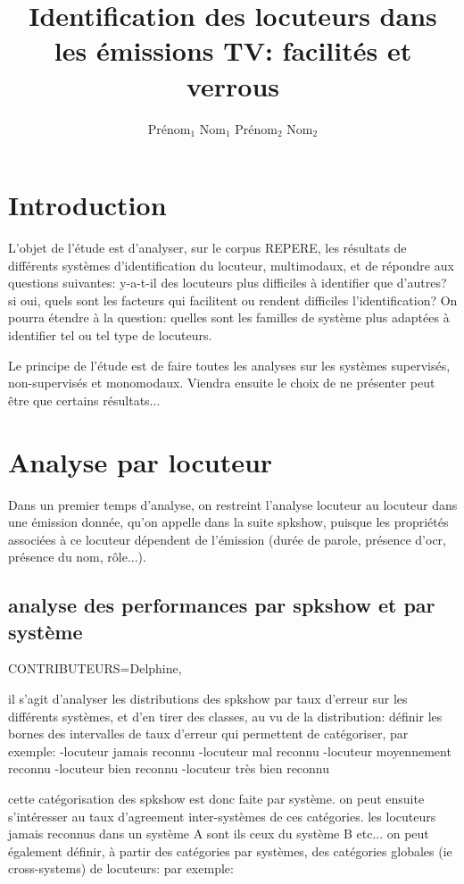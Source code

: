 \documentclass[utf8x]{article-hermes}
\title[Titre court]{Identification des locuteurs dans les émissions TV: facilités et verrous}
\author{Prénom$_1$ Nom$_1$\fup{*} \andauthor Prénom$_2$ Nom$_2$\fup{**}  }
\begin{document}
\maketitlepage

\newcommand{\fakesentence}{Attention à ce que les figures et les tableaux ne débordent pas dans les marges. }
\newcommand{\fakeparagraph}{
\fakesentence
\fakesentence
\fakesentence
\fakesentence
\fakesentence
\fakesentence
}

\section{Introduction}

L'objet de l'étude est d'analyser, sur le corpus REPERE, les résultats de différents systèmes d'identification du locuteur, multimodaux, et de répondre aux questions suivantes: y-a-t-il des locuteurs plus difficiles à identifier que d'autres? si oui, quels sont les facteurs qui facilitent ou rendent difficiles l'identification? 
On pourra étendre à la question: quelles sont les familles de système plus adaptées à identifier tel ou tel type de locuteurs.

Le principe de l'étude est de faire toutes les analyses sur les systèmes supervisés, non-supervisés et monomodaux. Viendra ensuite le choix de ne présenter peut être que certains résultats...

\section{Analyse par locuteur}

Dans un premier temps d'analyse, on restreint l'analyse locuteur au locuteur dans une émission donnée, qu'on appelle dans la suite spkshow, puisque les propriétés associées à ce locuteur dépendent de l'émission (durée de parole, présence d'ocr, présence du nom, rôle...).

\subsection{analyse des performances par spkshow et par système}
CONTRIBUTEURS=Delphine,

il s'agit d'analyser les distributions des spkshow par taux d'erreur sur les différents systèmes, et d'en tirer des classes, au vu de la distribution: définir les bornes des intervalles de taux d'erreur qui permettent de catégoriser, par exemple:
-locuteur jamais reconnu
-locuteur mal reconnu
-locuteur moyennement reconnu
-locuteur bien reconnu
-locuteur très bien reconnu

cette catégorisation des spkshow est donc faite par système.
on peut ensuite s'intéresser au taux d'agreement inter-systèmes de ces catégories. les locuteurs jamais reconnus dans un système A sont ils ceux du système B etc...
on peut également définir, à partir des catégories par systèmes, des catégories globales (ie cross-systems) de locuteurs:
par exemple:
\end{document}
